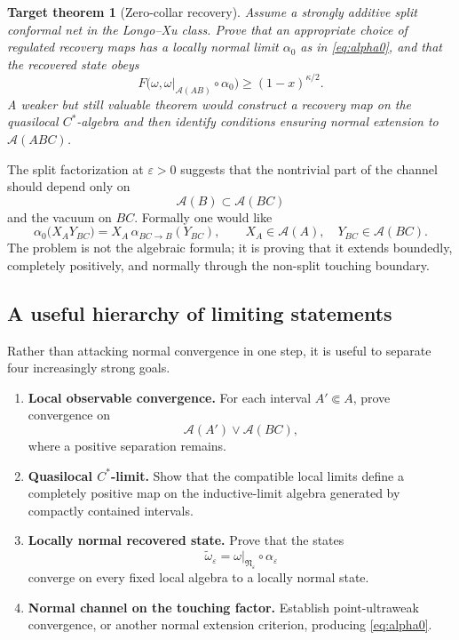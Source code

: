 \documentclass[11pt]{article}
\theoremstyle{accenttheorem}
\newtheorem{target}[conjecture]{Target theorem}
\theoremstyle{definition}
\newcommand{\cA}{\mathcal{A}}
\newcommand{\cN}{\mathfrak{N}}
\newcommand{\eps}{\varepsilon}
\newcommand{\1}{\mathbf{1}}
\begin{document}
\begin{target}[Zero-collar recovery]
Assume a strongly additive split conformal net in the Longo--Xu class.  Prove that an appropriate choice of regulated recovery maps has a locally normal limit \(\alpha_0\) as in \eqref{eq:alpha0}, and that the recovered state obeys
\[
 F\bigl(\omega,\omega|_{\cA(AB)}\circ\alpha_0\bigr)
 \ge (1-x)^{\kappa/2}.
\]
A weaker but still valuable theorem would construct a recovery map on the quasilocal \(C^*\)-algebra and then identify conditions ensuring normal extension to \(\cA(ABC)\).
\end{target}

The split factorization at \(\eps>0\) suggests that the nontrivial part of the channel should depend only on
\[
 \cA(B)\subset\cA(BC)
\]
and the vacuum on \(BC\).  Formally one would like
\begin{equation}\label{eq:formal-localized-map}
 \alpha_0\bigl(X_A Y_{BC}\bigr)
 =X_A\,\alpha_{BC\to B}(Y_{BC}),
 \qquad
 X_A\in\cA(A),\quad Y_{BC}\in\cA(BC).
\end{equation}
The problem is not the algebraic formula; it is proving that it extends boundedly, completely positively, and normally through the non-split touching boundary.

\subsection{A useful hierarchy of limiting statements}

Rather than attacking normal convergence in one step, it is useful to separate four increasingly strong goals.

\begin{enumerate}
\item \textbf{Local observable convergence.}  For each interval \(A'\Subset A\), prove convergence on
\[
 \cA(A')\vee\cA(BC),
\]
where a positive separation remains.

\item \textbf{Quasilocal \(C^*\)-limit.}  Show that the compatible local limits define a completely positive map on the inductive-limit algebra generated by compactly contained intervals.

\item \textbf{Locally normal recovered state.}  Prove that the states
\[
 \widetilde\omega_\eps
 =\omega|_{\cN_\eps}\circ\alpha_\eps
\]
converge on every fixed local algebra to a locally normal state.

\item \textbf{Normal channel on the touching factor.}  Establish point-ultraweak convergence, or another normal extension criterion, producing \eqref{eq:alpha0}.
\end{enumerate}
\end{document}
